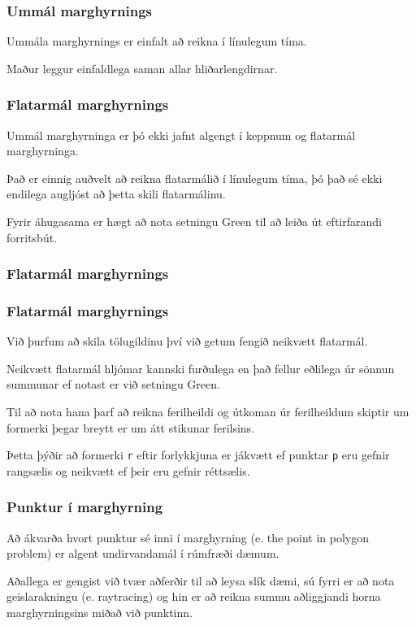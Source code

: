 {
	\frametitle{Ummál marghyrnings}
	{
		\item<1-> Ummála marghyrnings er einfalt að reikna í línulegum tíma.
		\item<2-> Maður leggur einfaldlega saman allar hliðarlengdirnar.
		\item<3->[] 
	}
}

{
	\frametitle{Flatarmál marghyrnings}
	{
		\item<1-> Ummál marghyrninga er þó ekki jafnt algengt í keppnum og flatarmál marghyrninga.
		\item<2-> Það er einnig auðvelt að reikna flatarmálið í línulegum tíma, þó það sé ekki
			endilega augljóst að þetta skili flatarmálinu.
		\item<3-> Fyrir áhugasama er hægt að nota setningu Green til að leiða út eftirfarandi forritsbút.
	}
}

{
	\frametitle{Flatarmál marghyrnings}
}

{
	\frametitle{Flatarmál marghyrnings}
	{
		\item<1-> Við þurfum að skila tölugildinu því við getum fengið neikvætt flatarmál.
		\item<2-> Neikvætt flatarmál hljómar kannski furðulega en það fellur eðlilega úr sönnun summunar
			ef notast er við setningu Green.
		\item<3-> Til að nota hana þarf að reikna ferilheildi og útkoman úr ferilheildum skiptir
			um formerki þegar breytt er um átt stikunar ferilsins.
		\item<4-> Þetta þýðir að formerki \texttt{r} eftir forlykkjuna er jákvætt ef punktar \texttt{p} 
			eru gefnir rangsælis og neikvætt ef þeir eru gefnir réttsælis.
	}
}

{
	\frametitle{Punktur í marghyrning}
	{
		\item<1-> Að ákvarða hvort punktur sé inni í marghyrning (e. the point in polygon problem) er algent undirvandamál
			í rúmfræði dæmum.
		\item<2-> Aðallega er gengist við tvær aðferðir til að leysa slík dæmi, sú fyrri er að nota geislarakningu 
			(e. raytracing) og hin er að reikna summu aðliggjandi horna marghyrningsins miðað við punktinn.
	}
}

